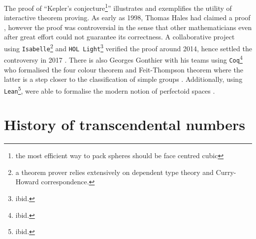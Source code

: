 \documentclass{report}
\theoremstyle{definition}
\begin{document}
The proof of ``Kepler's conjecture\footnote{the most efficient way to pack spheres should be face centred cubic}'' illustrates and exemplifies the utility of interactive theorem proving. As early as 1998, Thomas Hales had claimed a proof \cite{hales1998kepler,harrison2014history}, however the proof was controversial in the sense that other mathematicians even after great effort could not guarantee its correctness. A collaborative project using {\tt \small Isabelle}\footnote{a theorem prover relies extensively on dependent type theory and Curry-Howard correspondence.} and {\tt \small HOL Light}\footnote{ibid.} verified the proof around 2014, hence settled the controversy in 2017 \cite{hales2017formal}. There is also Georges Gonthier with his teams using {\tt \small Coq}\footnote{ibid.} who formalised the four colour theorem and Feit-Thompson theorem where the latter is a step closer to the classification of simple groups \cite{gonthier2008formal, gonthier2013machine}. Additionally, using {\tt \small Lean}\footnote{ibid.},  were able to formalise the modern notion of perfectoid spaces \cite{buzzard2020formalising}.

\section{History of transcendental numbers}
\end{document}
